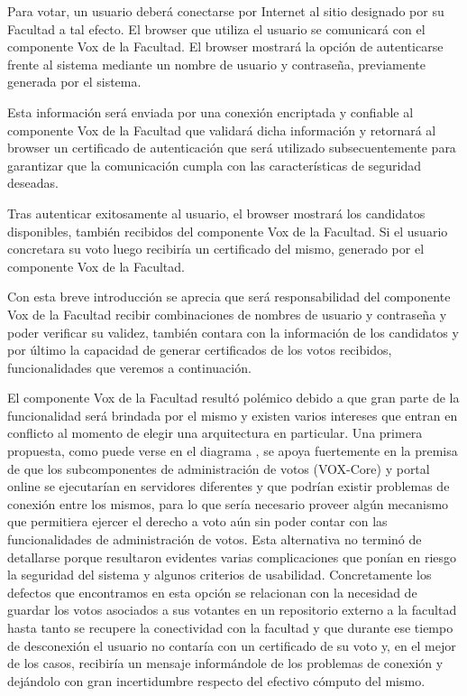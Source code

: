 Para votar, un usuario deberá conectarse por Internet al sitio designado por su Facultad a tal efecto. El browser que utiliza el usuario se comunicará con el componente Vox de la Facultad. El browser mostrará la opción de autenticarse frente al sistema mediante un nombre de usuario y contraseña, previamente generada por el sistema.

Esta información será enviada por una conexión encriptada y confiable al componente Vox de la Facultad que validará dicha información y retornará al browser un certificado de autenticación que será utilizado subsecuentemente para garantizar que la comunicación cumpla con las características de seguridad deseadas.

Tras autenticar exitosamente al usuario, el browser mostrará los candidatos disponibles, también recibidos del componente Vox de la Facultad. Si el usuario concretara su voto luego recibiría un certificado del mismo, generado por el componente Vox de la Facultad.

Con esta breve introducción se aprecia que será responsabilidad del componente Vox de la Facultad recibir combinaciones de nombres de usuario y contraseña y poder verificar su validez, también contara con la información de los candidatos y por último la capacidad de generar certificados de los votos recibidos, funcionalidades que veremos a continuación.


El componente Vox de la Facultad resultó polémico debido a que gran parte de la funcionalidad será brindada por el mismo y existen varios intereses que entran en conflicto al momento de elegir una arquitectura en particular. Una primera propuesta, como puede verse en el diagrama %
, se apoya fuertemente en la premisa de que los subcomponentes de administración de votos (VOX-Core) y portal online se ejecutarían en servidores diferentes y que podrían existir problemas de conexión entre los mismos, para lo que sería necesario proveer algún mecanismo que permitiera ejercer el derecho a voto aún sin poder contar con las funcionalidades de administración de votos. Esta alternativa no terminó de detallarse porque resultaron evidentes varias complicaciones que ponían en riesgo la seguridad del sistema y algunos criterios de usabilidad. Concretamente los defectos que encontramos en esta opción se relacionan con la necesidad de guardar los votos asociados a sus votantes en un repositorio externo a la facultad hasta tanto se recupere la conectividad con la facultad y que durante ese tiempo de desconexión el usuario no contaría con un certificado de su voto y, en el mejor de los casos, recibiría un mensaje informándole de los problemas de conexión y dejándolo con gran incertidumbre respecto del efectivo cómputo del mismo.


